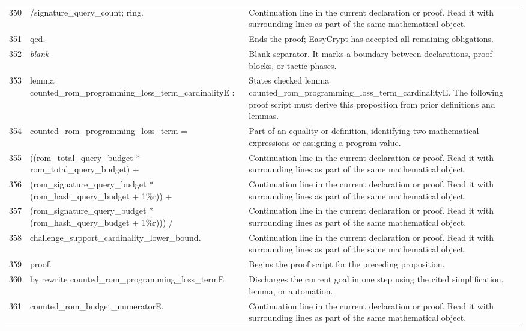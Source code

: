 \documentclass[10pt]{article}
\begin{document}
\begin{longtable}{r L{0.53\textwidth} L{0.37\textwidth}}
350 & {\ttfamily\scriptsize            /signature\_query\_count; ring.} & Continuation line in the current declaration or proof.  Read it with surrounding lines as part of the same mathematical object. \\
351 & {\ttfamily\scriptsize qed.} & Ends the proof; EasyCrypt has accepted all remaining obligations. \\
352 & {\ttfamily\scriptsize \emph{blank}} & Blank separator.  It marks a boundary between declarations, proof blocks, or tactic phases. \\
353 & {\ttfamily\scriptsize lemma counted\_rom\_programming\_loss\_term\_cardinalityE :} & States checked lemma counted\_rom\_programming\_loss\_term\_cardinalityE.  The following proof script must derive this proposition from prior definitions and lemmas. \\
354 & {\ttfamily\scriptsize   counted\_rom\_programming\_loss\_term =} & Part of an equality or definition, identifying two mathematical expressions or assigning a program value. \\
355 & {\ttfamily\scriptsize     ((rom\_total\_query\_budget * rom\_total\_query\_budget) +} & Continuation line in the current declaration or proof.  Read it with surrounding lines as part of the same mathematical object. \\
356 & {\ttfamily\scriptsize      (rom\_signature\_query\_budget * (rom\_hash\_query\_budget + 1\%r)) +} & Continuation line in the current declaration or proof.  Read it with surrounding lines as part of the same mathematical object. \\
357 & {\ttfamily\scriptsize      (rom\_signature\_query\_budget * (rom\_hash\_query\_budget + 1\%r))) /} & Continuation line in the current declaration or proof.  Read it with surrounding lines as part of the same mathematical object. \\
358 & {\ttfamily\scriptsize     challenge\_support\_cardinality\_lower\_bound.} & Continuation line in the current declaration or proof.  Read it with surrounding lines as part of the same mathematical object. \\
359 & {\ttfamily\scriptsize proof.} & Begins the proof script for the preceding proposition. \\
360 & {\ttfamily\scriptsize by rewrite counted\_rom\_programming\_loss\_termE} & Discharges the current goal in one step using the cited simplification, lemma, or automation. \\
361 & {\ttfamily\scriptsize            counted\_rom\_budget\_numeratorE.} & Continuation line in the current declaration or proof.  Read it with surrounding lines as part of the same mathematical object. \\

\end{longtable}
\end{document}
